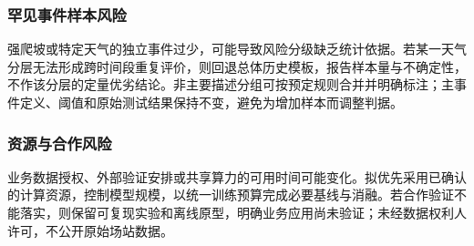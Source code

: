 \subsubsection{罕见事件样本风险}
强爬坡或特定天气的独立事件过少，可能导致风险分级缺乏统计依据。若某一天气分层无法形成跨时间段重复评价，则回退总体历史模板，报告样本量与不确定性，不作该分层的定量优劣结论。非主要描述分组可按预定规则合并并明确标注；主事件定义、阈值和原始测试结果保持不变，避免为增加样本而调整判据。

\subsubsection{资源与合作风险}
业务数据授权、外部验证安排或共享算力的可用时间可能变化。拟优先采用已确认的计算资源，控制模型规模，以统一训练预算完成必要基线与消融。若合作验证不能落实，则保留可复现实验和离线原型，明确业务应用尚未验证；未经数据权利人许可，不公开原始场站数据。
